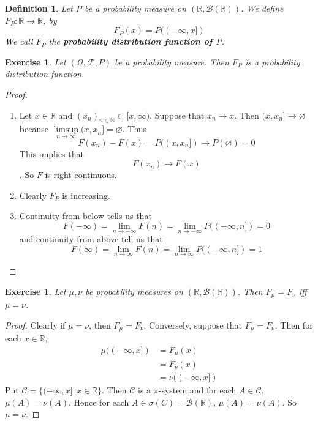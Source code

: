 \documentclass[12pt]{amsart}
\newtheorem{defn}[thm]{Definition}
\newtheorem{ex}[thm]{Exercise}
\newcommand{\sig}{\sigma}
\newcommand{\Om}{\Omega}
\newcommand{\N}{\mathbb{N}}
\newcommand{\R}{\mathbb{R}}
\newcommand{\MC}{\mathcal{C}}
\newcommand{\MB}{\mathcal{B}}
\newcommand{\MF}{\mathcal{F}}
\begin{document}
\begin{defn}
	Let $P $ be a probability measure on $(\R, \MB(\R))$. We define $F_P: \R \rightarrow \R$, by $$F_P(x) = P((-\infty, x])$$ We call $F_P$ the \textbf{probability distribution function of $P$}.
\end{defn}

\begin{ex}
	Let $(\Om, \MF, P)$ be a probability measure. Then $F_P$ is a probability distribution function.
\end{ex}

\begin{proof}
	\begin{enumerate}
		\item Let $x \in \R$ and $(x_n)_{n \in \N} \subset [x, \infty)$. Suppose that $x_n \rightarrow x$. Then $(x, x_n] \rightarrow \varnothing$ because $\limsup\limits_{n \rightarrow \infty} (x,x_n] = \varnothing$. Thus $$F(x_n) - F(x) = P((x, x_n]) \rightarrow P(\varnothing) = 0$$This implies that $$F(x_n) \rightarrow F(x)$$. So $F$ is right continuous.
		\item Clearly $F_P$ is increasing.
		\item Continuity from below tells us that $$F(-\infty) = \lim_{n \rightarrow -\infty}F(n) = \lim_{n \rightarrow -\infty}P((-\infty,n]) = 0$$ and continuity from above tell us that $$F(\infty)  = \lim_{n \rightarrow \infty}F(n) = \lim_{n \rightarrow \infty}P((-\infty, n]) = 1$$ 
	\end{enumerate}
\end{proof}

\begin{ex}
	Let $\mu, \nu$ be probability measures on $(\R, \MB(\R))$. Then $F_{\mu} = F_{\nu}$ iff $\mu = \nu$.  
\end{ex}

\begin{proof}
	Clearly if $\mu = \nu$, then $F_{\mu} = F_{\nu}$. Conversely, suppose that $F_{\mu} = F_{\nu}$. Then for each $x \in \R$, 
	\begin{align*}
		\mu((-\infty,x]) 
		&= F_{\mu}(x) \\
		&= F_{\nu}(x)  \\
		&= \nu((-\infty,x])
	\end{align*}
	Put $\MC = \{(-\infty,x]:x \in \R\} $. Then $\MC$ is a $\pi$-system and for each $A \in \MC$, $\mu(A) = \nu(A)$. Hence for each $A \in \sig(C) = \MB(\R)$, $\mu(A) = \nu(A)$. So $\mu = \nu$. 
\end{proof}
\end{document}
